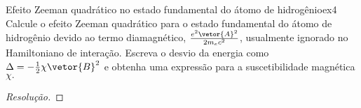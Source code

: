 \begin{exercício}{Efeito Zeeman quadrático no estado fundamental do átomo de hidrogênio}{ex4}
   Calcule o efeito Zeeman quadrático para o estado fundamental do átomo de hidrogênio devido ao termo diamagnético, \(\frac{e^2\vetor{A}^2}{2m_e c^2}\), usualmente ignorado no Hamiltoniano de interação. Escreva o desvio da energia como \(\Delta = -\frac12 \chi \vetor{B}^2\) e obtenha uma expressão para a suscetibilidade magnética \(\chi.\)
\end{exercício}
\begin{proof}[Resolução]
    
\end{proof}
